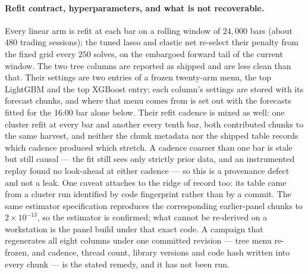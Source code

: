 \paragraph{Refit contract, hyperparameters, and what is not recoverable.}
Every linear arm is refit at each bar on a rolling window of $24{,}000$
bars (about $480$ trading sessions); the tuned lasso and elastic net
re-select their penalty from the fixed grid every $250$ solves, on the
embargoed forward tail of the current window. The two tree columns are
reported as shipped and are less clean than that. Their settings are
two entries of a frozen twenty-arm menu, the top LightGBM and the top XGBoost entry; each %
column's settings are stored with its forecast chunks, and where that menu comes from is
set out with the forecasts fitted for the 16:00 bar alone below.
Their refit cadence is mixed as well: one cluster refit at every bar and
another every tenth bar, both contributed chunks to the same harvest, and
neither the chunk metadata nor the shipped table records which cadence
produced which stretch. A cadence coarser than one bar is stale but still
causal --- the fit still sees only strictly prior data, and an instrumented
replay found no look-ahead at either cadence --- so this is a provenance
defect and not a leak. One caveat attaches to the ridge of record too: its
table came from a cluster run identified by code fingerprint rather than by
a commit. The same estimator specification reproduces the corresponding
earlier-panel chunks to $2\times 10^{-13}$, so the estimator is confirmed;
what cannot be re-derived on a workstation is the panel build under that
exact code. A campaign that regenerates all eight columns under one
committed revision --- tree menu re-frozen, and cadence, thread count,
library versions and code hash written into every chunk --- is the stated
remedy, and it has not been run.

